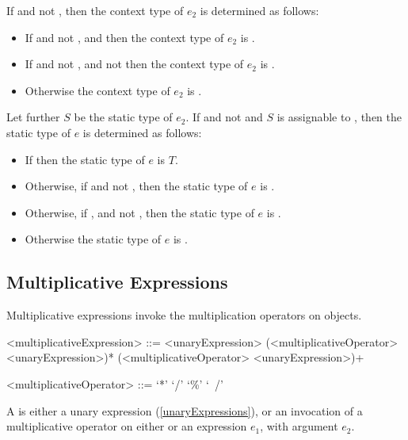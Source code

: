 \documentclass[makeidx]{article}
\begin{document}
{If  and not , then
the context type of $e_2$ is determined as follows:
\begin{itemize}
  \item{} If  and not ,
      and 
      then the context type of $e_2$ is .
  \item{} If  and not ,
      and not 
     then the context type of $e_2$ is .
  \item{} Otherwise the context type of $e_2$ is .
\end{itemize}
Let further $S$ be the static type of $e_2$.
If  and not 
and $S$ is assignable to ,
then the static type of $e$ is determined as follows:
\begin{itemize}
  \item{} If 
    then the static type of $e$ is $T$.
  \item{} Otherwise, if 
    and not ,
    then the static type of $e$ is .
  \item{} Otherwise, if ,
     and not ,
    then the static type of $e$ is .
  \item{} Otherwise the static type of $e$ is .
\end{itemize}

\subsection{Multiplicative Expressions}

\LMHash{}%
Multiplicative expressions invoke the multiplication operators on objects.

\begin{grammar}
<multiplicativeExpression> ::= \gnewline{}
  <unaryExpression> (<multiplicativeOperator> <unaryExpression>)*
  \alt \SUPER{} (<multiplicativeOperator> <unaryExpression>)+

<multiplicativeOperator> ::= `*'
  \alt `/'
  \alt `\%'
  \alt `~/'
\end{grammar}

\LMHash{}%
A  is either a unary expression
(\ref{unaryExpressions}),
or an invocation of a multiplicative operator
on either \SUPER{} or an expression $e_1$,
with argument $e_2$.

}
\end{document}

